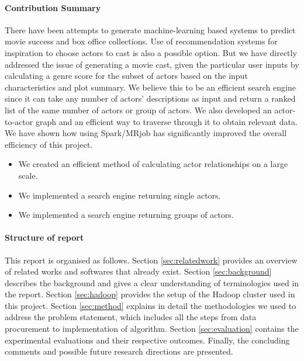 \paragraph{\textbf{Contribution Summary}}
There have been attempts to generate machine-learning based systems to predict movie success and box office collections. Use of recommendation systems for inspiration to choose actors to cast is also a possible option. But we have directly addressed the issue of generating a movie cast, given the particular user inputs by calculating a genre score for the subset of actors based on the input characteristics and plot summary. We believe this to be an efficient search engine since it can take any number of actors’ descriptions as input and return a ranked list of the same number of actors or group of actors. We also developed an actor-to-actor graph and an efficient way to traverse through it to obtain relevant data. We have shown how using Spark/MRjob has significantly improved the overall efficiency of this project. 

\begin{itemize}
    \item We created an efficient method of calculating actor relationships on a large scale.
    \item We implemented a search engine returning single actors.
    \item We implemented a search engine returning groups of actors.
\end{itemize}

\paragraph{\textbf{Structure of report}}
This report is organised as follows. Section \ref{sec:relatedwork} provides an overview of related works and softwares that already exist. Section \ref{sec:background} describes the background and gives a clear understanding of terminologies used in the report. Section \ref{sec:hadoop} provides the setup of the Hadoop cluster used in this project. Section \ref{sec:method} explains in detail the methodologies we used to address the problem statement, which includes all the steps from data procurement to implementation of algorithm. Section \ref{sec:evaluation} contains the experimental evaluations and their respective outcomes. Finally, the concluding comments and possible future research directions are presented.
